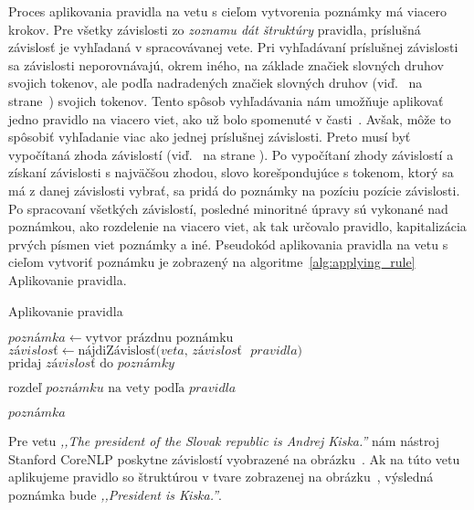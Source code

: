 Proces aplikovania pravidla na vetu s cieľom vytvorenia poznámky má viacero krokov. Pre všetky závislosti zo \textit{zoznamu dát štruktúry} pravidla, príslušná závislosť je vyhľadaná v spracovávanej vete. Pri vyhľadávaní príslušnej závislosti sa závislosti neporovnávajú, okrem iného, na základe značiek slovných druhov svojich tokenov, ale podľa nadradených značiek slovných druhov (viď.~ na strane~\pageref{paragraph:superior_pos_tag}) svojich tokenov. Tento spôsob vyhľadávania nám umožňuje aplikovať jedno pravidlo na viacero viet, ako už bolo spomenuté v časti~. Avšak, môže to spôsobiť vyhľadanie viac ako jednej príslušnej závislosti. Preto musí byť vypočítaná zhoda závislostí (viď.~ na strane \pageref{paragraph:dependency_match}). Po vypočítaní zhody závislostí a získaní závislosti s najväčšou zhodou, slovo korešpondujúce s tokenom, ktorý sa má z danej závislosti vybrať, sa pridá do poznámky na pozíciu pozície závislosti. Po spracovaní všetkých závislostí, posledné minoritné úpravy sú vykonané nad poznámkou, ako rozdelenie na viacero viet, ak tak určovalo pravidlo, kapitalizácia prvých písmen viet poznámky a iné. Pseudokód aplikovania pravidla na vetu s cieľom vytvoriť poznámku je zobrazený na algoritme~\ref{alg:applying_rule} Aplikovanie pravidla.

\begin{algorithm}
	\caption[Aplikovanie pravidla]{Aplikovanie pravidla}\label{alg:applying_rule}
	\begin{algorithmic}[1]
		\State $poznámka \gets \text{vytvor prázdnu poznámku}$
		\State $závislosť \gets \text{nájdiZávislosť(} veta \text{, } závislosť\text{ } pravidla \text{)}$
		\State $\text{pridaj } závislosť \text{ do } poznámky$
		\EndIf
		\EndFor
		
		\State $\text{rozdeľ } poznámku \text{ na vety podľa } pravidla$	
		
		\Return $poznámka$
		\EndProcedure
	\end{algorithmic}
\end{algorithm}

Pre vetu \textit{,,The president of the Slovak republic is Andrej Kiska.''} nám nástroj Stanford CoreNLP poskytne závislostí vyobrazené na obrázku~. Ak na túto vetu aplikujeme pravidlo so štruktúrou v tvare zobrazenej na obrázku~, výsledná poznámka bude \textit{,,President is Kiska.''}. 

